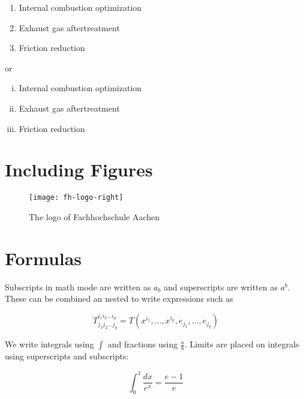 \begin{enumerate}[{Example} a)]
    \item Internal combustion optimization
    \item Exhaust gas aftertreatment
    \item Friction reduction
\end{enumerate}

or

\begin{enumerate}[(i)]
    \item Internal combustion optimization
    \item Exhaust gas aftertreatment
    \item Friction reduction
\end{enumerate}


\section{Including Figures}
\label{sec:Including Figures}

\lipsum[1]

\begin{figure}[!h]
    \centering
    \texttt{[image: fh-logo-right]}
    \caption[The FH Aachen Logo]{The logo of Fachhochschule Aachen}
    \label{fh-logo}
\end{figure}

\section{Formulas}
\label{sec:Formulas}

Subscripts in math mode are written as $a_b$ and superscripts are written as $a^b$. These can be combined an nested to write expressions such as

\begin{equation}
    T^{i_1 i_2 \dots i_p}_{j_1 j_2 \dots j_q} = T(x^{i_1},\dots,x^{i_p},e_{j_1},\dots,e_{j_q})
    \label{a complicated formula 1}
\end{equation}

We write integrals using $\int$ and fractions using $\frac{a}{b}$. Limits are placed on integrals using superscripts and subscripts:

\begin{equation}
    \int_0^1 \frac{dx}{e^x} =  \frac{e-1}{e}
\end{equation}

